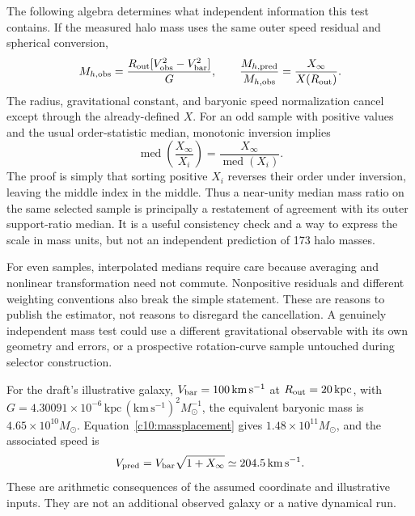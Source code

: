 The following algebra determines what independent information this test contains. If the measured halo mass uses the same outer speed residual and spherical conversion,
\begin{equation}
 M_{h,{\rm obs}}=\frac{R_{\rm out}[V_{\rm obs}^2-V_{\rm bar}^2]}{G},
 \qquad \frac{M_{h,{\rm pred}}}{M_{h,{\rm obs}}}
 =\frac{X_\infty}{X(R_{\rm out})}.
 \label{c10:ratioidentity}
\end{equation}
The radius, gravitational constant, and baryonic speed normalization cancel except through the already-defined $X$. For an odd sample with positive values and the usual order-statistic median, monotonic inversion implies
\begin{equation}
 \operatorname{med}\!\left(\frac{X_\infty}{X_i}\right)
 =\frac{X_\infty}{\operatorname{med}(X_i)}.
 \label{c10:medianidentity}
\end{equation}
The proof is simply that sorting positive $X_i$ reverses their order under inversion, leaving the middle index in the middle. Thus a near-unity median mass ratio on the same selected sample is principally a restatement of agreement with its outer support-ratio median. It is a useful consistency check and a way to express the scale in mass units, but not an independent prediction of 173 halo masses.

For even samples, interpolated medians require care because averaging and nonlinear transformation need not commute. Nonpositive residuals and different weighting conventions also break the simple statement. These are reasons to publish the estimator, not reasons to disregard the cancellation. A genuinely independent mass test could use a different gravitational observable with its own geometry and errors, or a prospective rotation-curve sample untouched during selector construction.

For the draft's illustrative galaxy, $V_{\rm bar}=100\,\mathrm{km\,s^{-1}}$ at $R_{\rm out}=20\,\mathrm{kpc}$, with $G=4.30091\times10^{-6}\,\mathrm{kpc}\,(\mathrm{km\,s^{-1}})^2M_\odot^{-1}$, the equivalent baryonic mass is $4.65\times10^{10}M_\odot$. Equation~\eqref{c10:massplacement} gives $1.48\times10^{11}M_\odot$, and the associated speed is
\begin{equation}
 V_{\rm pred}=V_{\rm bar}\sqrt{1+X_\infty}
 \simeq204.5\,\mathrm{km\,s^{-1}}.
 \label{c10:example}
\end{equation}
These are arithmetic consequences of the assumed coordinate and illustrative inputs. They are not an additional observed galaxy or a native dynamical run.

